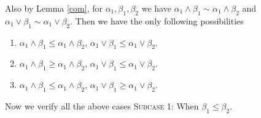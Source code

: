 \documentclass[10pt,reqno]{amsart}
\numberwithin{equation}{section}
\begin{document}
\noindent Also by Lemma \ref{com}, for 
$\alpha_1,\beta_1,\beta_2$ we have $\alpha_1 \wedge \beta_1 \sim \alpha_1 \wedge \beta_2$ and 
$\alpha_1 \vee \beta_1 \sim \alpha_1 \vee \beta_2$. Then we have the only following  possibilities
\begin{enumerate}
 \item $\alpha_1 \wedge \beta_1 \leq \alpha_1 \wedge \beta_2$, $\alpha_1 \vee \beta_1 \leq \alpha_1 \vee \beta_2$. 
 \item $\alpha_1 \wedge \beta_1 \geq \alpha_1 \wedge \beta_2$, $\alpha_1 \vee \beta_1 \leq \alpha_1 \vee \beta_2$.
 \item $\alpha_1 \wedge \beta_1 \leq \alpha_1 \wedge \beta_2$, $\alpha_1 \vee \beta_1 \geq \alpha_1 \vee \beta_2$.
\end{enumerate}
Now we verify all the above cases
\vskip 1mm \noindent
\textsc{Subcase 1:} When $\beta_1 \leq \beta_2$.
\end{document}
